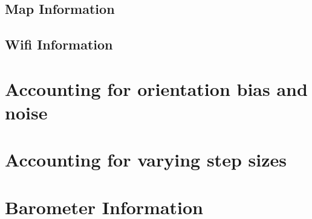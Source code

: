 \subsection{Map Information}



\subsection{Wifi Information}

\section{Accounting for orientation bias and noise}

\section{Accounting for varying step sizes}

\section{Barometer Information}


